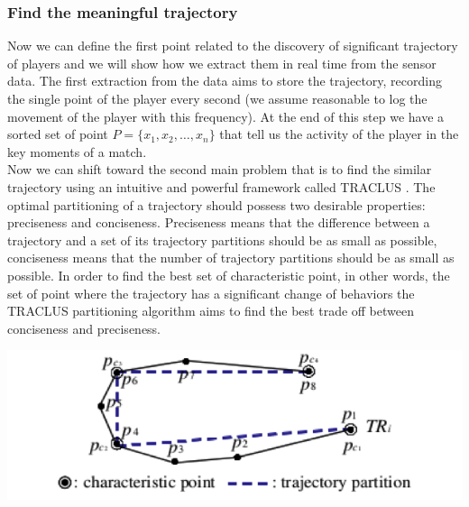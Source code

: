 \documentclass{acm_proc_article-sp-sigmod07}
\begin{document}
\subsubsection{Find the meaningful trajectory}
Now we can define the first point related to the discovery of significant trajectory of players and we will show how we extract them in real time from the sensor data.
The first extraction from the data aims to store the trajectory, recording the single point of the player every second (we assume reasonable to log the movement of the player with this frequency). At the end of this step we have a sorted set of point $P = \{x_1, x_2, \ldots, x_n\}$ that tell us the activity of the player in the key moments of a match.\\
Now we can shift toward the second main problem that is to find the similar trajectory using an intuitive and powerful framework called TRACLUS \cite{lee2007trajectory}. The optimal partitioning of a trajectory should possess two desirable properties: preciseness and conciseness. Preciseness means that the difference between a trajectory and a set of its trajectory partitions should be as small as possible, conciseness means that the number of trajectory partitions should be as small as possible. In order to find the best set of characteristic point, in other words, the set of point where the trajectory has a significant change of behaviors the TRACLUS partitioning algorithm aims to find the best trade off between conciseness and preciseness. 


\includegraphics[scale=0.8]{traclus1}
\end{document}
